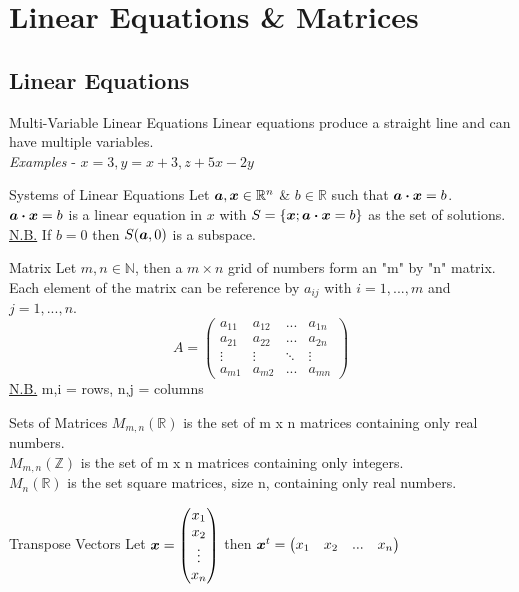 \documentclass[11pt,a4paper]{article}
\begin{document}
\section{Linear Equations \& Matrices}

\subsection{Linear Equations}
%
\subtitle{Definition 3.01 - }{Multi-Variable Linear Equations}
Linear equations produce a straight line and can have multiple variables. \\
\textit{Examples} - $x = 3, y = x + 3, z + 5x - 2y$ \\

\subtitle{Defintion 3.02 - }{Systems of Linear Equations}
Let $\boldsymbol{a}, \boldsymbol{x} \in \mathbb{R}^n$ \& $b \in \mathbb{R}$ such that $\boldsymbol{a} \boldsymbol{\cdot} \boldsymbol{x} = b$. \\
$\boldsymbol{a} \boldsymbol{\cdot} \boldsymbol{x} = b$ is a linear equation in $x$ with $S = \{\boldsymbol{x}; \boldsymbol{a} \boldsymbol{\cdot} \boldsymbol{x} = b\}$ as the set of solutions. \\
\underline{N.B.} If $b = 0$ then $S(\boldsymbol{a}, 0)$ is a subspace. \\

\subtitle{Definition 3.03 - }{Matrix}
Let $m, n \in \mathbb{N}$, then a $m \times n$ grid of numbers form an "m" by "n" matrix.
Each element of the matrix can be reference by $a_{ij}$ with $i = 1, ... , m$ and $j = 1, ... , n$.
$$ A = \begin{pmatrix}
  a_{11} & a_{12} & ... & a_{1n} \\
  a_{21} & a_{22} & ... & a_{2n} \\
  \vdots & \vdots & \ddots & \vdots \\
  a_{m1} & a_{m2} & ... & a_{mn}
\end{pmatrix}
$$
\underline{N.B.} m,i = rows, n,j = columns \\

\subtitle{Definition 3.04 - }{Sets of Matrices}
$M_{m,n}(\mathbb{R})$ is the set of m x n matrices containing only real numbers. \\
$M_{m,n}(\mathbb{Z})$ is the set of m x n matrices containing only integers. \\
$M_{n}(\mathbb{R})$ is the set square matrices, size n, containing only real numbers. \\

\subtitle{Definition 3.05 - }{Transpose Vectors}
Let $\boldsymbol{x} = \begin{pmatrix} x_1 \\ x_2 \\ \vdots \\ x_n\end{pmatrix}$ then $\boldsymbol{x}^t = \begin{pmatrix} x_1 & x_2 & ... & x_n\end{pmatrix}$
\end{document}
